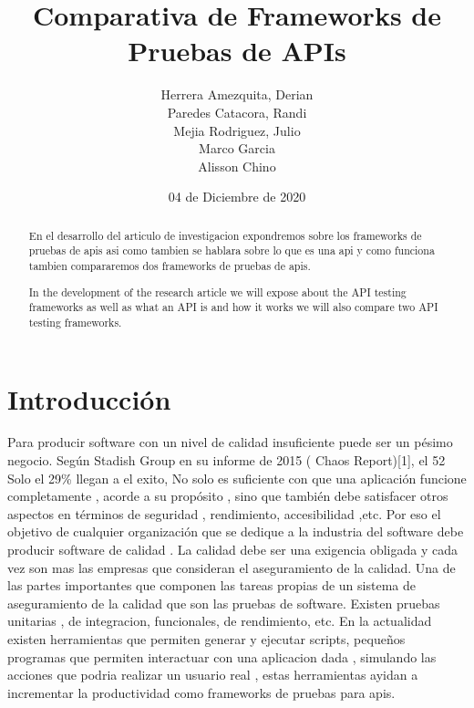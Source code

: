 \documentclass[twocolumn]{article}
\newenvironment{poliabstract}[1]
   {\renewcommand{\abstractname}{#1}\begin{abstract}}
   {\end{abstract}}
\begin{document}
\title{Comparativa de Frameworks de Pruebas de APIs}
\author{Herrera Amezquita,
Derian  \\Paredes Catacora, Randi \\Mejia Rodriguez, Julio\\Marco Garcia\\Alisson Chino}


\date{04 de Diciembre de 2020}

\maketitle

\begin{poliabstract}{Resumen} 
  En el desarrollo del articulo de investigacion expondremos sobre los frameworks de pruebas de apis asi como tambien se hablara sobre lo que es una api y como funciona tambien compararemos dos frameworks de pruebas de apis.
  
\end{poliabstract}

\begin{poliabstract}{Abstract} 
  In the development of the research article we will expose about the API testing frameworks as well as what an API is and how it works we will also compare two API testing frameworks.
\end{poliabstract}

\section{Introducción}
Para producir software con un nivel  de calidad  insuficiente puede ser un pésimo negocio. Según Stadish Group en su informe de 2015 ( Chaos Report)[1], el 52%
Solo el 29\% llegan a el exito, No solo es suficiente con que una aplicación funcione completamente , acorde a su propósito , sino que también debe satisfacer otros aspectos en términos de seguridad , rendimiento, accesibilidad ,etc. Por eso el objetivo de cualquier organización que se dedique a la industria del software debe producir software de calidad .
La calidad debe ser una  exigencia obligada y cada vez son mas las empresas que consideran el aseguramiento de la calidad.
Una de las partes importantes que componen las tareas propias de un sistema de aseguramiento de la calidad que son las pruebas de software.
Existen pruebas unitarias , de integracion, funcionales, de rendimiento, etc. 
En la actualidad existen herramientas que permiten generar y ejecutar scripts, pequeños programas que permiten interactuar con una aplicacion dada , simulando las acciones que podria realizar un usuario real
, estas herramientas ayidan a incrementar la productividad como frameworks de pruebas para apis.
\end{document}
